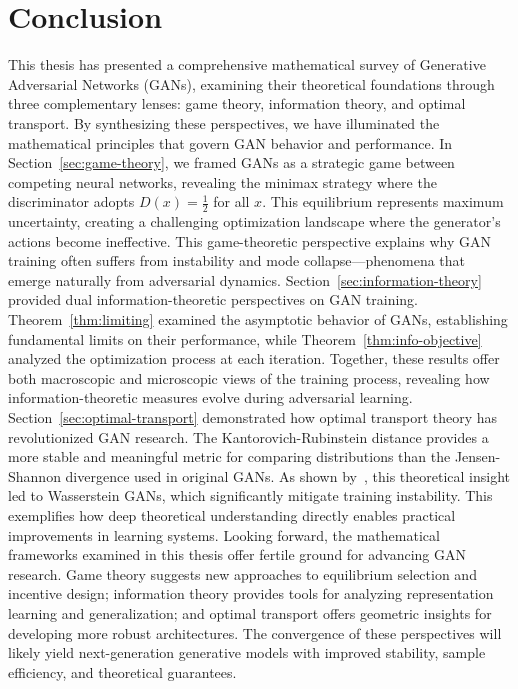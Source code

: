 \section{Conclusion}
This thesis has presented a comprehensive mathematical survey of Generative Adversarial Networks (GANs), examining their theoretical foundations through three complementary lenses: game theory, information theory, and optimal transport. By synthesizing these perspectives, we have illuminated the mathematical principles that govern GAN behavior and performance.
In Section~\ref{sec:game-theory}, we framed GANs as a strategic game between competing neural networks, revealing the minimax strategy where the discriminator adopts $D(x) = \frac{1}{2}$ for all $x$. This equilibrium represents maximum uncertainty, creating a challenging optimization landscape where the generator's actions become ineffective. This game-theoretic perspective explains why GAN training often suffers from instability and mode collapse—phenomena that emerge naturally from adversarial dynamics.
Section~\ref{sec:information-theory} provided dual information-theoretic perspectives on GAN training. Theorem~\ref{thm:limiting} examined the asymptotic behavior of GANs, establishing fundamental limits on their performance, while Theorem~\ref{thm:info-objective} analyzed the optimization process at each iteration. Together, these results offer both macroscopic and microscopic views of the training process, revealing how information-theoretic measures evolve during adversarial learning.
Section~\ref{sec:optimal-transport} demonstrated how optimal transport theory has revolutionized GAN research. The Kantorovich-Rubinstein distance provides a more stable and meaningful metric for comparing distributions than the Jensen-Shannon divergence used in original GANs. As shown by~\cite{ref:arjovsky-2017}, this theoretical insight led to Wasserstein GANs, which significantly mitigate training instability. This exemplifies how deep theoretical understanding directly enables practical improvements in learning systems.
Looking forward, the mathematical frameworks examined in this thesis offer fertile ground for advancing GAN research. Game theory suggests new approaches to equilibrium selection and incentive design; information theory provides tools for analyzing representation learning and generalization; and optimal transport offers geometric insights for developing more robust architectures. The convergence of these perspectives will likely yield next-generation generative models with improved stability, sample efficiency, and theoretical guarantees.
